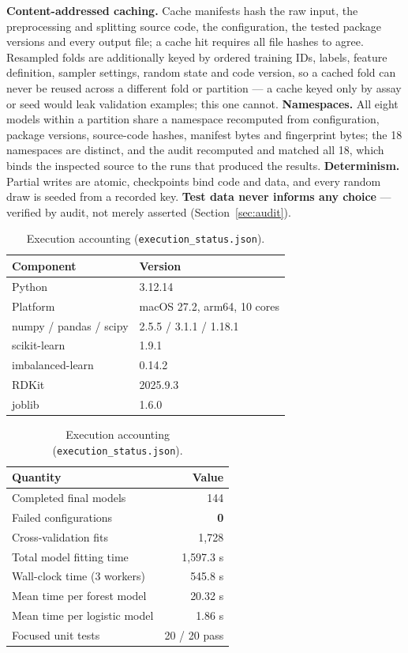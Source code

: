 \documentclass[10pt,letterpaper]{article}
\begin{document}
\textbf{Content-addressed caching.} Cache manifests hash the raw input, the preprocessing and
splitting source code, the configuration, the tested package versions and every output file; a cache
hit requires all file hashes to agree. Resampled folds are additionally keyed by ordered training
IDs, labels, feature definition, sampler settings, random state and code version, so a cached fold
can never be reused across a different fold or partition --- a cache keyed only by assay or seed
would leak validation examples; this one cannot. \textbf{Namespaces.} All eight models within a
partition share a namespace recomputed from configuration, package versions, source-code hashes,
manifest bytes and fingerprint bytes; the 18 namespaces are distinct, and the audit recomputed and
matched all 18, which binds the inspected source to the runs that produced the results.
\textbf{Determinism.} Partial writes are atomic, checkpoints bind code and data, and every random
draw is seeded from a recorded key. \textbf{Test data never informs any choice} --- verified by
audit, not merely asserted (Section~\ref{sec:audit}).

\begin{table}[!htbp]
\centering
\small
\begin{minipage}[t]{0.47\textwidth}
\centering
\caption{Execution environment (\texttt{environment.json}).}
\label{tab:env}
\footnotesize
\begin{tabular}{@{}ll@{}}
\toprule
Component & Version \\
\midrule
Python & 3.12.14 \\
Platform & macOS 27.2, arm64, 10 cores \\
numpy / pandas / scipy & 2.5.5 / 3.1.1 / 1.18.1 \\
scikit-learn & 1.9.1 \\
imbalanced-learn & 0.14.2 \\
RDKit & 2025.9.3 \\
joblib & 1.6.0 \\
\bottomrule
\end{tabular}
\end{minipage}\hfill
\begin{minipage}[t]{0.49\textwidth}
\centering
\caption{Execution accounting (\texttt{execution\_status.json}).}
\label{tab:exec}
\footnotesize
\begin{tabular}{@{}lr@{}}
\toprule
Quantity & Value \\
\midrule
Completed final models & 144 \\
Failed configurations & \textbf{0} \\
Cross-validation fits & 1{,}728 \\
Total model fitting time & 1{,}597.3 s \\
Wall-clock time (3 workers) & 545.8 s \\
Mean time per forest model & 20.32 s \\
Mean time per logistic model & 1.86 s \\
Focused unit tests & 20 / 20 pass \\
\bottomrule
\end{tabular}
\end{minipage}
\end{table}
\end{document}
